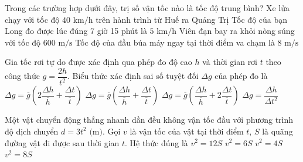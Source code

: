 \begin{ex}
	Trong các trường hợp dưới đây, trị số vận tốc nào là tốc độ trung bình?
	\choice
	{\True Xe lửa chạy với tốc độ $40\text{ km/h}$ trên hành trình từ Huế ra Quảng Trị}
	{Tốc độ của bạn Long đo được lúc đúng 7 giờ 15 phút là $5\text{ km/h}$}
	{Viên đạn bay ra khỏi nòng súng với tốc độ $600\text{ m/s}$}
	{Tốc độ của đầu búa máy ngay tại thời điểm va chạm là $8\text{ m/s}$}
\end{ex}

\begin{ex}
	Gia tốc rơi tự do được xác định qua phép đo độ cao $h$ và thời gian rơi $t$ theo công thức $g = \dfrac{2h}{t^2}$. Biểu thức xác định sai số tuyệt đối $\Delta g$ của phép đo là
	\choice
	{$\Delta g = \overline{g}\left(2\dfrac{\Delta h}{\overline{h}} + \dfrac{\Delta t}{\overline{t}}\right)$}
	{$\Delta g = \overline{g}\left(\dfrac{\Delta h}{\overline{h}} + \dfrac{\Delta t}{\overline{t}}\right)$}
	{\True $\Delta g = \overline{g}\left(\dfrac{\Delta h}{\overline{h}} + 2\dfrac{\Delta t}{\overline{t}}\right)$}
	{$\Delta g = \dfrac{\Delta h}{\Delta t^2}$}
\end{ex}

\begin{ex}
	Một vật chuyển động thẳng nhanh dần đều không vận tốc đầu với phương trình độ dịch chuyển $d = 3t^2\text{ (m)}$. Gọi $v$ là vận tốc của vật tại thời điểm $t$, $S$ là quãng đường vật đi được sau thời gian $t$. Hệ thức đúng là
	\choice
	{\True $v^2 = 12S$}
	{$v^2 = 6S$}
	{$v^2 = 4S$}
	{$v^2 = 8S$}
\end{ex}

